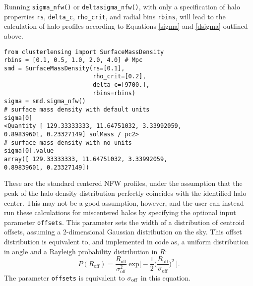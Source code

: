 \documentclass{emulateapj}
\newcommand{\code}{\lstinline[style=codeintext]}
\begin{document}
Running \code{sigma_nfw()} or \code{deltasigma_nfw()}, with only a specification of halo properties \code{rs}, \code{delta_c}, \code{rho_crit}, and radial bins \code{rbins}, will lead to the calculation of halo profiles according to Equations \ref{sigma} and \ref{dsigma} outlined above. 

\begin{lstlisting}
from clusterlensing import SurfaceMassDensity
rbins = [0.1, 0.5, 1.0, 2.0, 4.0] # Mpc
smd = SurfaceMassDensity(rs=[0.1], 
                         rho_crit=[0.2], 
                         delta_c=[9700.], 
                         rbins=rbins)
sigma = smd.sigma_nfw()
# surface mass density with default units
sigma[0]
<Quantity [ 129.33333333, 11.64751032, 3.33992059, 
0.89839601, 0.23327149] solMass / pc2>
# surface mass density with no units
sigma[0].value
array([ 129.33333333, 11.64751032, 3.33992059, 
0.89839601, 0.23327149])
\end{lstlisting}

These are the standard centered NFW profiles, under the assumption that the peak of the halo density distribution perfectly coincides with the identified halo center. This may not be a good assumption, however, and the user can instead run these calculations for miscentered halos by specifying the optional input parameter \code{offsets}. This parameter sets the width of a distribution of centroid offsets, assuming a 2-dimensional Gaussian distribution on the sky. This offset distribution is equivalent to, and implemented in code as, a uniform distribution in angle and a Rayleigh probability distribution in $R$:
\begin{equation}\label{PofR}
P(R_{\mathrm{off}})=\frac{R_{\mathrm{off}}}{\sigma_{\mathrm{off}}^2}\ \mathrm{exp}\bigg[-\frac{1}{2}\bigg(\frac{R_{\mathrm{off}}}{\sigma_{\mathrm{off}}}\bigg)^2\ \bigg].
\end{equation}
The parameter \code{offsets} is equivalent to $\sigma_{\rm off}$ in this equation.
\end{document}
